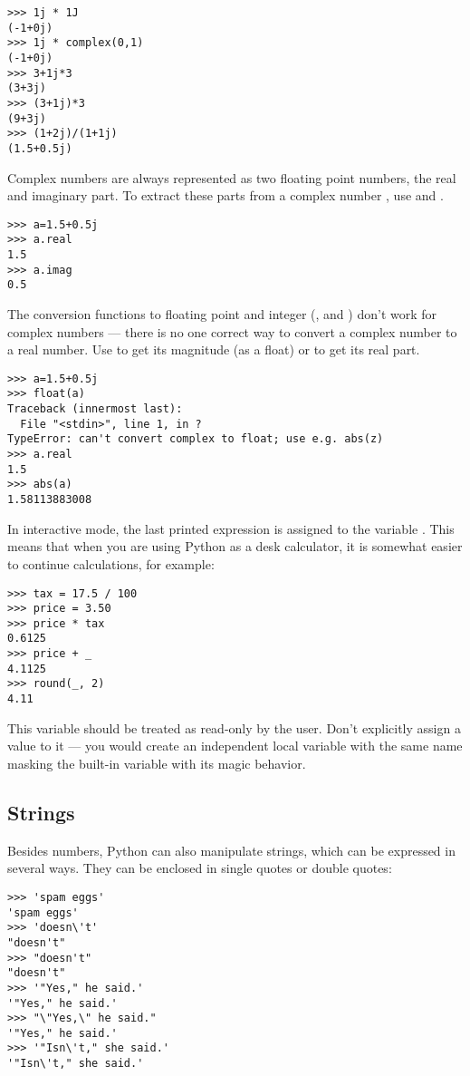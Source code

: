 \documentclass{manual}
\begin{document}
\begin{verbatim}
>>> 1j * 1J
(-1+0j)
>>> 1j * complex(0,1)
(-1+0j)
>>> 3+1j*3
(3+3j)
>>> (3+1j)*3
(9+3j)
>>> (1+2j)/(1+1j)
(1.5+0.5j)
\end{verbatim}
%
Complex numbers are always represented as two floating point numbers,
the real and imaginary part.  To extract these parts from a complex
number , use  and .  

\begin{verbatim}
>>> a=1.5+0.5j
>>> a.real
1.5
>>> a.imag
0.5
\end{verbatim}
%
The conversion functions to floating point and integer
(,  and ) don't
work for complex numbers --- there is no one correct way to convert a
complex number to a real number.  Use  to get its
magnitude (as a float) or  to get its real part.

\begin{verbatim}
>>> a=1.5+0.5j
>>> float(a)
Traceback (innermost last):
  File "<stdin>", line 1, in ?
TypeError: can't convert complex to float; use e.g. abs(z)
>>> a.real
1.5
>>> abs(a)
1.58113883008
\end{verbatim}
%
In interactive mode, the last printed expression is assigned to the
variable \code{_}.  This means that when you are using Python as a
desk calculator, it is somewhat easier to continue calculations, for
example:

\begin{verbatim}
>>> tax = 17.5 / 100
>>> price = 3.50
>>> price * tax
0.6125
>>> price + _
4.1125
>>> round(_, 2)
4.11
\end{verbatim}

This variable should be treated as read-only by the user.  Don't
explicitly assign a value to it --- you would create an independent
local variable with the same name masking the built-in variable with
its magic behavior.

\subsection{Strings}
\label{strings}

Besides numbers, Python can also manipulate strings, which can be
expressed in several ways.  They can be enclosed in single quotes or
double quotes:

\begin{verbatim}
>>> 'spam eggs'
'spam eggs'
>>> 'doesn\'t'
"doesn't"
>>> "doesn't"
"doesn't"
>>> '"Yes," he said.'
'"Yes," he said.'
>>> "\"Yes,\" he said."
'"Yes," he said.'
>>> '"Isn\'t," she said.'
'"Isn\'t," she said.'
\end{verbatim}
\end{document}
